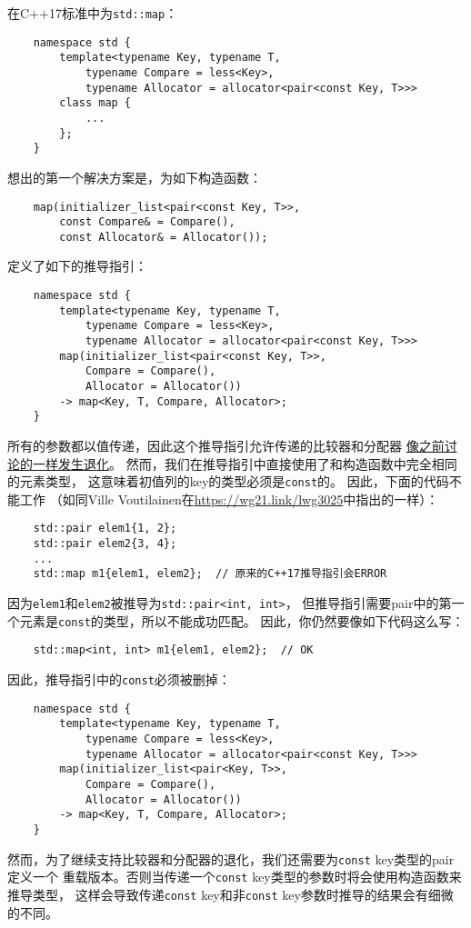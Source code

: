 在C++17标准中为\texttt{std::map}：
\begin{lstlisting}
    namespace std {
        template<typename Key, typename T,
            typename Compare = less<Key>,
            typename Allocator = allocator<pair<const Key, T>>>
        class map {
            ...
        };
    }
\end{lstlisting}
想出的第一个解决方案是，为如下构造函数：
\begin{lstlisting}
    map(initializer_list<pair<const Key, T>>,
        const Compare& = Compare(),
        const Allocator& = Allocator());
\end{lstlisting}
定义了如下的推导指引：
\begin{lstlisting}
    namespace std {
        template<typename Key, typename T,
            typename Compare = less<Key>,
            typename Allocator = allocator<pair<const Key, T>>>
        map(initializer_list<pair<const Key, T>>,
            Compare = Compare(),
            Allocator = Allocator())
        -> map<Key, T, Compare, Allocator>;
    }
\end{lstlisting}
所有的参数都以值传递，因此这个推导指引允许传递的比较器和分配器
\hyperref[ch9.2.1]{像之前讨论的一样发生退化}。
然而，我们在推导指引中直接使用了和构造函数中完全相同的元素类型，
这意味着初值列的key的类型必须是\texttt{const}的。
因此，下面的代码不能工作
（如同Ville Voutilainen在\url{https://wg21.link/lwg3025}中指出的一样）：
\begin{lstlisting}
    std::pair elem1{1, 2};
    std::pair elem2{3, 4};
    ...
    std::map m1{elem1, elem2};  // 原来的C++17推导指引会ERROR
\end{lstlisting}
因为\texttt{elem1}和\texttt{elem2}被推导为\texttt{std::pair<int, int>}，
但推导指引需要pair中的第一个元素是\texttt{const}的类型，所以不能成功匹配。
因此，你仍然要像如下代码这么写：
\begin{lstlisting}
    std::map<int, int> m1{elem1, elem2};  // OK
\end{lstlisting}
因此，推导指引中的\texttt{const}必须被删掉：
\begin{lstlisting}
    namespace std {
        template<typename Key, typename T,
            typename Compare = less<Key>,
            typename Allocator = allocator<pair<const Key, T>>>
        map(initializer_list<pair<Key, T>>,
            Compare = Compare(),
            Allocator = Allocator())
        -> map<Key, T, Compare, Allocator>;
    }
\end{lstlisting}
然而，为了继续支持比较器和分配器的退化，我们还需要为\texttt{const} key类型的pair定义一个
重载版本。否则当传递一个\texttt{const} key类型的参数时将会使用构造函数来推导类型，
这样会导致传递\texttt{const} key和非\texttt{const} key参数时推导的结果会有细微的不同。


